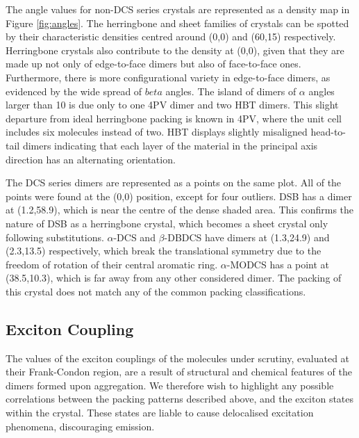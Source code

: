 The angle values for non-DCS series crystals are represented as a density map in Figure \ref{fig:angles}. The herringbone and sheet families of crystals can be spotted by their characteristic densities centred around (0\degree{},0\degree{}) and (60\degree{},15\degree{}) respectively. Herringbone crystals also contribute to the density at (0\degree{},0\degree{}), given that they are made up not only of edge-to-face dimers but also of face-to-face ones. Furthermore, there is more configurational variety in edge-to-face dimers, as evidenced by the wide spread of $beta$ angles. The island of dimers of $\alpha$ angles larger than 10\degree{} is due only to one 4PV dimer and two HBT dimers. This slight departure from ideal herringbone packing is known in 4PV\cite{VanHutten1999}, where the unit cell includes six molecules instead of two. HBT displays slightly misaligned head-to-tail dimers indicating that each layer of the material in the principal axis direction has an alternating orientation.

The DCS series dimers are represented as a points on the same plot. All of the points were found at the (0\degree{},0\degree{}) position, except for four outliers. DSB has a dimer at (1.2\degree{},58.9\degree{}), which is near the centre of the dense shaded area. This confirms the nature of DSB as a herringbone crystal, which becomes a sheet crystal only following substitutions. $\alpha$-DCS and $\beta$-DBDCS have dimers at (1.3\degree{},24.9\degree{}) and (2.3\degree{},13.5\degree{}) respectively, which break the translational symmetry due to the freedom of rotation of their central aromatic ring. $\alpha$-MODCS has a point at (38.5\degree{},10.3\degree{}), which is far away from any other considered dimer. The packing of this crystal does not match any of the common packing classifications.

\subsection{Exciton Coupling}
The values of the exciton couplings of the molecules under scrutiny, evaluated at their Frank-Condon region, are a result of structural and chemical features of the dimers formed upon aggregation. We therefore wish to highlight any possible correlations between the packing patterns described above, and the exciton states within the crystal. These states are liable to cause delocalised excitation phenomena, discouraging emission.

